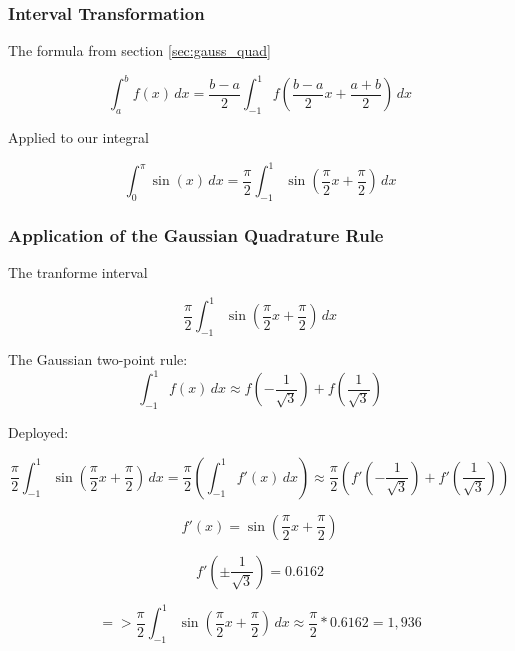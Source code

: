 \subsubsection{Interval Transformation}

The formula from section \ref{sec:gauss_quad}

\begin{equation}
\int_a^b f(x)\,dx = \frac{b-a}{2} \int_{-1}^1 f\left(\frac{b-a}{2}x + \frac{a+b}{2}\right)\,dx
\end{equation}

Applied to our integral

\begin{equation}
\int_0^\pi \sin(x) \, dx = \frac{\pi}{2} \int_{-1}^1 \sin\left(\frac{\pi}{2}x + \frac{\pi}{2}\right)\,dx
\end{equation}

\subsubsection{Application of the Gaussian Quadrature Rule}

The tranforme interval

\begin{equation}
\frac{\pi}{2} \int_{-1}^1 \sin\left(\frac{\pi}{2}x + \frac{\pi}{2}\right)\,dx
\end{equation}

The Gaussian two-point rule:
$$\int_{-1}^1 f(x) \, dx \approx f(- \frac{1}{\sqrt{3}} ) + f( \frac{1}{\sqrt{3}} )$$

Deployed:

\begin{equation}
\frac{\pi}{2} \int_{-1}^1 \sin\left(\frac{\pi}{2}x + \frac{\pi}{2}\right)\,dx
= \frac{\pi}{2} \left( \int_{-1}^1 f'(x) \, dx \right)
\approx  \frac{\pi}{2} \left( f'(- \frac{1}{\sqrt{3}} ) + f'( \frac{1}{\sqrt{3}} ) \right)
\end{equation}

\begin{equation}
f'(x) = \sin\left(\frac{\pi}{2}x + \frac{\pi}{2}\right)
\end{equation}

\begin{equation}
f'(\pm \frac{1}{\sqrt{3}}) = 0.6162
\end{equation}

\begin{equation}
=> \frac{\pi}{2} \int_{-1}^1 \sin\left(\frac{\pi}{2}x + \frac{\pi}{2}\right)\,dx
\approx \frac{\pi}{2} * 0.6162 = 1,936
\end{equation}


